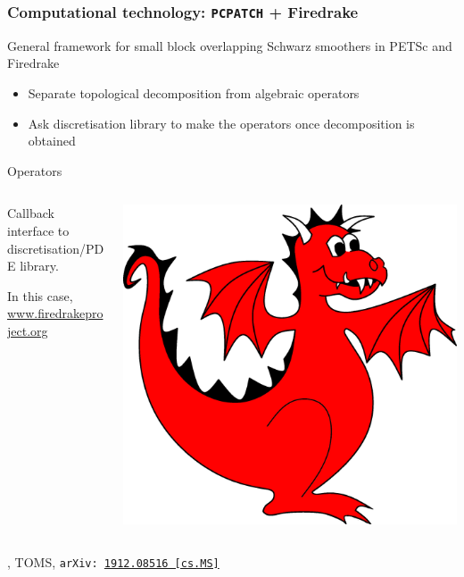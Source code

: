 \documentclass[presentation,aspectratio=43, 10pt]{beamer}
\newcommand{\arxivlink}[2]{{\texttt{arXiv:\,\href{https://arxiv.org/abs/#1}{#1\,[#2]}}}}
\begin{document}
\begin{frame}
  \frametitle{Computational technology: \texttt{PCPATCH} + Firedrake}
  General framework for small block overlapping Schwarz smoothers in
  PETSc and Firedrake

  \begin{itemize}
  \item Separate topological decomposition from algebraic operators
  \item Ask discretisation library to make the operators once
    decomposition is obtained
  \end{itemize}
  \begin{block}{Operators}
    \begin{columns}
      \begin{column}{0.65\textwidth}
        Callback interface to discretisation/PDE library.

        In this case, \url{www.firedrakeproject.org}
      \end{column}
      \begin{column}{0.2\textwidth}
        \includegraphics[width=\textwidth]{firedrake}
      \end{column}
    \end{columns}
  \end{block}

  {\raggedleft
    \scriptsize \textcite{Farrell:2021b}, TOMS, \arxivlink{1912.08516}{cs.MS}\par}
\end{frame}
\end{document}
